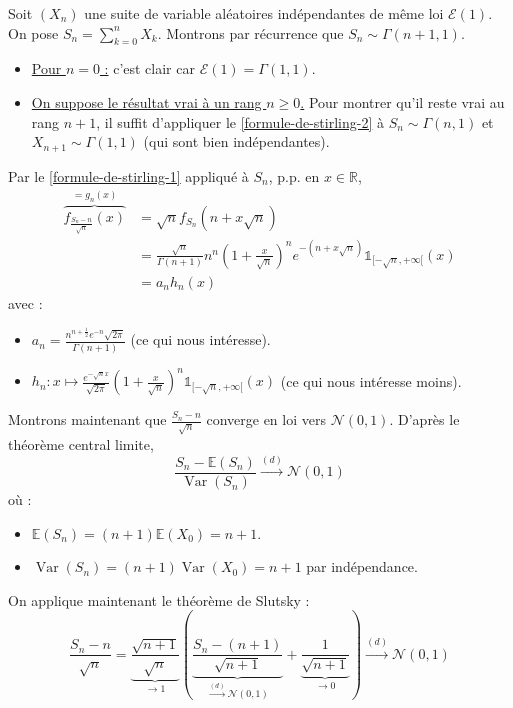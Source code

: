 	\begin{demonstration}
		Soit $(X_n)$ une suite de variable aléatoires indépendantes de même loi $\mathcal{E}(1)$. On pose $S_n = \sum_{k=0}^n X_k$. Montrons par récurrence que $S_n \sim \Gamma(n+1, 1)$.
		\begin{itemize}
			\item \underline{Pour $n = 0$ :} c'est clair car $\mathcal{E}(1) = \Gamma(1, 1)$.
			\item \underline{On suppose le résultat vrai à un rang $n \geq 0$.} Pour montrer qu'il reste vrai au rang $n+1$, il suffit d'appliquer le \cref{formule-de-stirling-2} à $S_n \sim \Gamma(n, 1)$ et $X_{n+1} \sim \Gamma(1, 1)$ (qui sont bien indépendantes).
		\end{itemize}
		Par le \cref{formule-de-stirling-1} appliqué à $S_n$, p.p. en $x \in \mathbb{R}$,
		\begin{align*}
			\overbrace{f_{\frac{S_n - n}{\sqrt{n}}}(x)}^{= g_n(x)} & = \sqrt{n} f_{S_n} (n + x \sqrt{n}) \\
			& = \frac{\sqrt{n}}{\Gamma(n+1)} n^n \left(1 + \frac{x}{\sqrt{n}} \right)^n e^{-(n + x\sqrt{n})} \mathbb{1}_{[-\sqrt{n}, +\infty[}(x) \\
			& = a_n h_n(x)
		\end{align*}
		avec :
		\begin{itemize}
			\item $a_n = \frac{n^{n+\frac{1}{2}} e^{-n} \sqrt{2 \pi}}{\Gamma(n+1)}$ (ce qui nous intéresse).
			\item $h_n : x \mapsto \frac{e^{-\sqrt{n} x}}{\sqrt{2\pi}} \left( 1 + \frac{x}{\sqrt{n}} \right)^n \mathbb{1}_{[-\sqrt{n}, +\infty[}(x)$ (ce qui nous intéresse moins).
		\end{itemize}
		\medskip
		Montrons maintenant que $\frac{S_n - n}{\sqrt{n}}$ converge en loi vers $\mathcal{N}(0,1)$. D'après le théorème central limite,
		\[ \frac{S_n - \mathbb{E}(S_n)}{\operatorname{Var}(S_n)} \overset{(d)}{\longrightarrow} \mathcal{N}(0,1) \]
		où :
		\begin{itemize}
			\item $\mathbb{E}(S_n) = (n+1) \mathbb{E}(X_0) = n+1$.
			\item $\operatorname{Var}(S_n) = (n+1) \operatorname{Var}(X_0) = n+1$ par indépendance.
		\end{itemize}
		On applique maintenant le théorème de Slutsky :
		\[ \frac{S_n - n}{\sqrt{n}} = \underbrace{\frac{\sqrt{n+1}}{\sqrt{n}}}_{\longrightarrow 1} \left( \underbrace{\frac{S_n - (n+1)}{\sqrt{n+1}}}_{\overset{(d)}{\longrightarrow} \mathcal{N}(0,1)} + \underbrace{\frac{1}{\sqrt{n+1}}}_{\longrightarrow 0} \right) \overset{(d)}{\longrightarrow} \mathcal{N}(0,1) \]

\end{demonstration}
